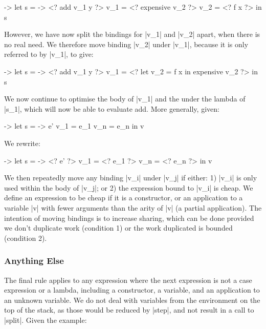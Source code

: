 \documentclass[draft]{sigplanconf}
\begin{document}
\begin{code}
\x ->  let  s    = \y -> <? add v_1 y ?>
            v_1  = <? expensive v_2 ?>
            v_2  = <? f x ?>
       in   s
\end{code}

However, we have now split the bindings for |v_1| and |v_2| apart, when there is no real need. We therefore move binding |v_2| under |v_1|, because it is only referred to by |v_1|, to give:

\begin{code}
\x ->  let  s    = \y -> <? add v_1 y ?>
            v_1  = <? let v_2 = f x in expensive v_2 ?>
       in   s
\end{code}

We now continue to optimise the body of |v_1| and the under the lambda of |s_1|, which will now be able to evaluate add. More generally, given:

\begin{code}
\free ->  let  s    = \x -> e'
               v_1  = e_1
               v_n  = e_n
          in   v
\end{code}

We rewrite:

\begin{code}
\free ->  let  s    = \x -> <? e' ?>
               v_1  = <? e_1 ?>
               v_n  = <? e_n ?>
          in   v
\end{code}

We then repeatedly move any binding |v_i| under |v_j| if either: 1) |v_i| is only used within the body of |v_j|; or 2) the expression bound to |v_i| is cheap. We define an expression to be cheap if it is a constructor, or an application to a variable |v| with fewer arguments than the arity of |v| (a partial application). The intention of moving bindings is to increase sharing, which can be done provided we don't duplicate work (condition 1) or the work duplicated is bounded (condition 2).

\subsubsection{Anything Else}
\label{sec:eval_split_other}

The final rule applies to any expression where the next expression is not a case expression or a lambda, including a constructor, a variable, and an application to an unknown variable. We do not deal with variables from the environment on the top of the stack, as those would be reduced by |step|, and not result in a call to |split|. Given the example:
\end{document}
